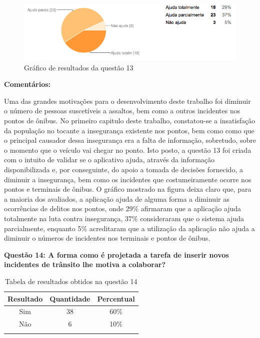 \begin{figure}[h]
\begin{center}
  \includegraphics[width=16cm]{images/graficos/questao13.png}
  \caption{Gráfico de resultados da questão 13}
  \label{fig:questao13}
\end{center}
\end{figure}

\textbf{Comentários:}

Uma das grandes motivações para o desenvolvimento deste trabalho foi diminuir o número de pessoas suscetíveis a assaltos, bem como a outros incidentes nos pontos de ônibus. No primeiro capitulo deste trabalho, constatou-se a insatisfação da população no tocante a insegurança existente nos pontos, bem como como que o principal causador dessa insegurança era a falta de informação, sobretudo, sobre o momento que o veículo vai chegar no ponto. 
Isto posto, a questão 13 foi criada com o intuito de validar se o aplicativo ajuda, através da informação disponibilizada e, por conseguinte, do apoio a tomada de decisões fornecido, a diminuir a insegurança, bem como os incidentes que costumeiramente ocorre nos pontos e terminais de ônibus.
O gráfico mostrado na figura  deixa claro que, para a maioria dos avaliados, a aplicação ajuda de alguma forma a diminuir as ocorrências de delitos nos pontos, onde 29\% afirmaram que a aplicação ajuda totalmente na luta contra insegurança, 37\% consideraram que o sistema ajuda parcialmente, enquanto 5\% acreditaram que a utilização da aplicação não ajuda a diminuir o números de incidentes nos terminais e pontos de ônibus.\newline


\textbf{Questão 14: A forma como é projetada a tarefa de inserir novos incidentes de trânsito lhe motiva a colaborar?}

\begin{center}
\begin{longtable}{c|c|c}
\hline
    \multicolumn{1}{c}{\textbf{Resultado}} & \multicolumn{1}{c}{\textbf{Quantidade}} & \multicolumn{1}{c}{\textbf{Percentual}} \\
\hline
    Sim & 38 &  60\%\\
    \hline
    Não & 6 & 10\%\\
    \hline
\caption{Tabela de resultados obtidos na questão 14}
\label{tabq14}
\end{longtable}
\end{center}


